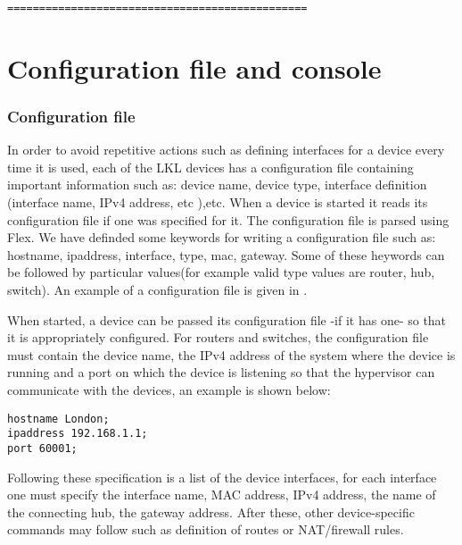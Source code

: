 {{\begin{itemize}
\begin{lstlisting}
===============================================
\end{lstlisting}
 

\section{Configuration file and console}
\label{sec:config}

\subsubsection{Configuration file}
\label{subsec:config-file}
In order to avoid repetitive actions such as defining interfaces for a device every time it is used, each of the LKL devices has a configuration file containing important information such as: device name, device type, interface definition (interface name, IPv4 address, etc ),etc. When a device is started it reads its configuration file if one was specified for it. The configuration file is parsed using Flex. We have definded some keywords for writing a configuration file such as: hostname, ipaddress, interface, type, mac, gateway. Some of these heywords can be followed by particular values(for example valid type values are router, hub, switch). An example of a configuration file is given in .

When started, a device can be passed its configuration file -if it has one- so that it is appropriately configured.
For routers and switches, the configuration file must contain the device name, the IPv4 address of the system where the device is running and a port on which the device is listening so that the hypervisor can communicate with the devices, an example is shown below:
\lstset{language=zsh,caption=Fields of Configuration File,label=lst:config-file}
\begin{lstlisting}
hostname London;
ipaddress 192.168.1.1;
port 60001;
\end{lstlisting}
Following these specification is a list of the device interfaces, for each interface one must specify the interface name, MAC address, IPv4 address, the name of the connecting hub, the gateway address. After these, other device-specific commands may follow such as definition of routes or NAT/firewall rules.


\end{itemize}}}
